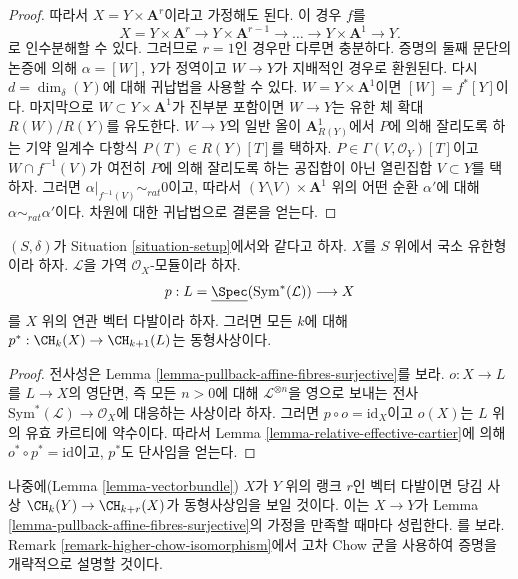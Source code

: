 \begin{proof}
\medskip\noindent
따라서 $X = Y \times \mathbf{A}^r$이라고 가정해도 된다. 이 경우
$f$를
$$
X = Y \times \mathbf{A}^r \to
Y \times \mathbf{A}^{r - 1} \to \ldots \to
Y \times \mathbf{A}^1 \to Y.
$$
로 인수분해할 수 있다. 그러므로 $r = 1$인 경우만 다루면 충분하다.
증명의 둘째 문단의 논증에 의해 $\alpha = [W]$, $Y$가 정역이고
$W \to Y$가 지배적인 경우로 환원된다. 다시
$d = \dim_\delta(Y)$에 대해 귀납법을 사용할 수 있다.
$W = Y \times \mathbf{A}^1$이면 $[W] = f^*[Y]$이다.
마지막으로 $W \subset Y \times \mathbf{A}^1$가 진부분 포함이면
$W \to Y$는 유한 체 확대 $R(W)/R(Y)$를 유도한다.
$W \to Y$의 일반 올이 $\mathbf{A}^1_{R(Y)}$에서 $P$에 의해 잘리도록
하는 기약 일계수 다항식 $P(T) \in R(Y)[T]$를 택하자.
$P \in \Gamma(V, \mathcal{O}_Y)[T]$이고
$W \cap f^{-1}(V)$가 여전히 $P$에 의해 잘리도록 하는 공집합이 아닌
열린집합 $V \subset Y$를 택하자. 그러면
$\alpha|_{f^{-1}(V)} \sim_{rat} 0$이고, 따라서
$(Y \setminus V) \times \mathbf{A}^1$ 위의 어떤 순환 $\alpha'$에 대해
$\alpha \sim_{rat} \alpha'$이다. 차원에 대한 귀납법으로 결론을 얻는다.
\end{proof}

\begin{lemma}
\label{lemma-linebundle}
$(S, \delta)$가 Situation \ref{situation-setup}에서와 같다고 하자.
$X$를 $S$ 위에서 국소 유한형이라 하자.
$\mathcal{L}$을 가역 $\mathcal{O}_X$-모듈이라 하자.
$$
p :
L = \underline{\Spec}(\text{Sym}^*(\mathcal{L}))
\longrightarrow
X
$$
를 $X$ 위의 연관 벡터 다발이라 하자. 그러면 모든 $k$에 대해
$p^* : \CH_k(X) \to \CH_{k + 1}(L)$는 동형사상이다.
\end{lemma}

\begin{proof}
전사성은 Lemma \ref{lemma-pullback-affine-fibres-surjective}를 보라.
$o : X \to L$를 $L \to X$의 영단면, 즉 모든 $n > 0$에 대해
$\mathcal{L}^{\otimes n}$을 영으로 보내는 전사
$\text{Sym}^*(\mathcal{L}) \to \mathcal{O}_X$에 대응하는 사상이라 하자.
그러면 $p \circ o = \text{id}_X$이고 $o(X)$는 $L$ 위의 유효 카르티에
약수이다. 따라서 Lemma \ref{lemma-relative-effective-cartier}에 의해
$o^* \circ p^* = \text{id}$이고, $p^*$도 단사임을 얻는다.
\end{proof}

\begin{remark}
\label{remark-when-isomorphism}
나중에(Lemma \ref{lemma-vectorbundle}) $X$가 $Y$ 위의 랭크 $r$인 벡터
다발이면 당김 사상 $\CH_k(Y) \to \CH_{k + r}(X)$가 동형사상임을 보일
것이다. 이는 $X \to Y$가 Lemma
\ref{lemma-pullback-affine-fibres-surjective}의 가정을 만족할 때마다
성립한다. \cite[Lemma 2.2]{Totaro-group}를 보라. Remark
\ref{remark-higher-chow-isomorphism}에서 고차 Chow 군을 사용하여 증명을
개략적으로 설명할 것이다.
\end{remark}

